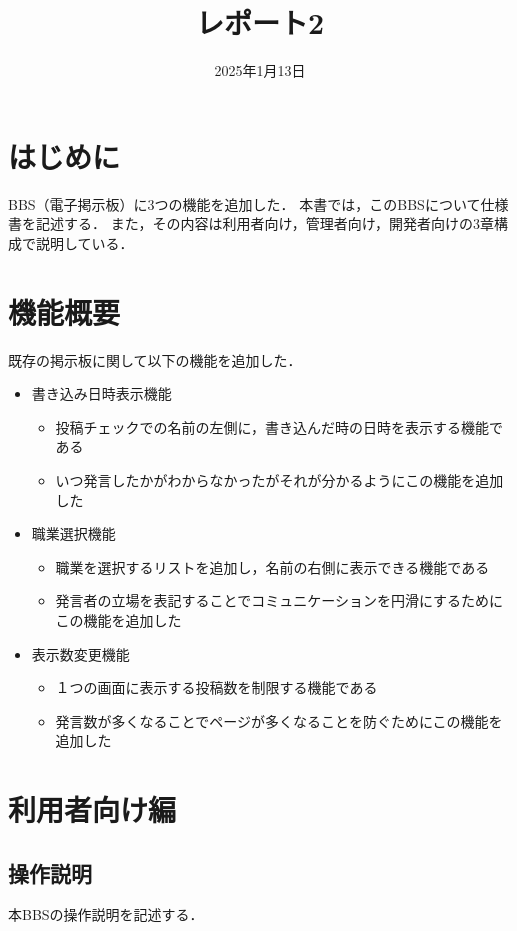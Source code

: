 \documentclass[uplatex,dvipdfmx]{jsarticle}
\begin{document}
\title{レポート2}
\date{2025年1月13日}
\maketitle
\section{はじめに}
BBS（電子掲示板）に3つの機能を追加した．
本書では，このBBSについて仕様書を記述する．
また，その内容は利用者向け，管理者向け，開発者向けの3章構成で説明している．
\section{機能概要}
既存の掲示板に関して以下の機能を追加した．\par

\begin{itemize}
	\item 書き込み日時表示機能
	\begin{itemize}
		\item 投稿チェックでの名前の左側に，書き込んだ時の日時を表示する機能である
		\item いつ発言したかがわからなかったがそれが分かるようにこの機能を追加した
	\end{itemize}
	\item 職業選択機能
	\begin{itemize}
		\item 職業を選択するリストを追加し，名前の右側に表示できる機能である
		\item 発言者の立場を表記することでコミュニケーションを円滑にするためにこの機能を追加した
	\end{itemize}
	\item 表示数変更機能
	\begin{itemize}
		\item １つの画面に表示する投稿数を制限する機能である
		\item  発言数が多くなることでページが多くなることを防ぐためにこの機能を追加した
	\end{itemize}
\end{itemize}


\section{利用者向け編}
\subsection{操作説明}
本BBSの操作説明を記述する．\par
\end{document}
